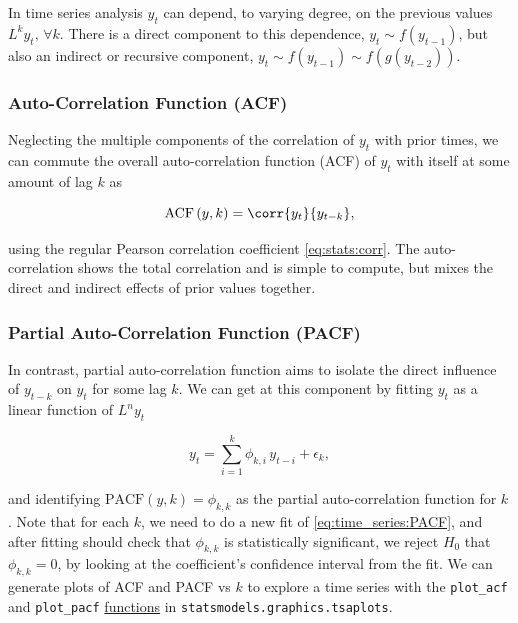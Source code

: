 In time series analysis $y_{t}$ can depend, to varying degree,
on the previous values $L^{k} y_{t},\, \forall k$.
There is a direct component to this dependence,
$y_{t} \sim f\left(y_{t-1}\right)$,
but also an indirect or recursive component,
$y_{t} \sim f\left(y_{t-1}\right) \sim f\left(g\left(y_{t-2}\right)\right)$.

\subsubsection{Auto-Correlation Function (ACF)}
\label{additional:time_series:ACF}

Neglecting the multiple components of the correlation of $y_{t}$ with prior times,
we can commute the overall auto-correlation function (ACF) of $y_{t}$
with itself at some amount of lag $k$ as

\begin{equation}\label{eq:time_series:ACF}
\text{ACF}\left(y,k\right) = \corr{y_{t}}{y_{t-k}},
\end{equation}

\noindent using the regular Pearson correlation coefficient \cref{eq:stats:corr}.
The auto-correlation shows the total correlation and is simple to compute,
but mixes the direct and indirect effects of prior values together.

\subsubsection{Partial Auto-Correlation Function (PACF)}
\label{additional:time_series:PACF}

In contrast, partial auto-correlation function
aims to isolate the direct influence of $y_{t-k}$ on $y_{t}$ for some lag $k$.
We can get at this component by fitting $y_{t}$ as a linear function of $L^{n} y_{t}$

\begin{equation}\label{eq:time_series:PACF}
y_{t} = \sum_{i=1}^{k} \phi_{k,i}\, y_{t-i} + \epsilon_{k},
\end{equation}

\noindent and identifying $\text{PACF}\left(y,k\right) = \phi_{k,k}$
as the partial auto-correlation function for $k$.
Note that for each $k$, we need to do a new fit of \cref{eq:time_series:PACF},
and after fitting should check that $\phi_{k,k}$ is statistically significant,
\ie we reject $H_{0}$ that $\phi_{k,k}=0$, by looking at the coefficient's confidence interval from the fit.
We can generate plots of ACF and PACF vs $k$ to explore a time series
with the \texttt{plot\_acf} and \texttt{plot\_pacf}
\href{https://www.statsmodels.org/stable/graphics.html}{functions} in \texttt{statsmodels.graphics.tsaplots}.


